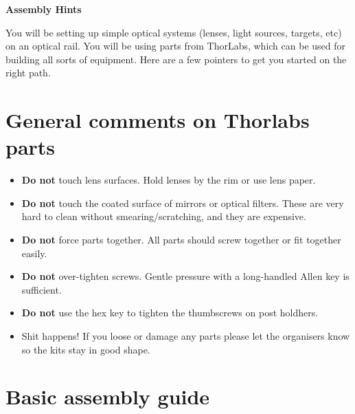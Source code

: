 \documentclass[a4paper]{report}
\begin{document}
	
	\setcounter{secnumdepth}{2}
	
	\begin{center}
		\textbf{\Large{Assembly Hints}}
	\end{center}
	
	You will be setting up simple optical systems (lenses, light sources, targets, etc) on an optical rail. 
        You will be using parts from ThorLabs, which can be used for building all sorts of equipment. 
	Here are a few pointers to get you started on the right path.
	

	\section{General comments on Thorlabs parts}
	
	\begin{itemize}
		\item \textbf{Do not} touch lens surfaces. Hold lenses by the rim or use lens paper.
		\item \textbf{Do not} touch the coated surface of mirrors or optical filters. These are very hard to clean without smearing/scratching, and they are expensive.
		\item \textbf{Do not} force parts together. All parts should screw together or fit together easily.
		\item \textbf{Do not} over-tighten screws. Gentle pressure with a long-handled Allen key is sufficient. 
        \item \textbf{Do not} use the hex key to tighten the thumbscrews on post holdhers.
		\item Shit happens! If you loose or damage any parts please let the organisers know so the kits stay in good shape.
	\end{itemize}
	
	\section{Basic assembly guide}
	
\end{document}
